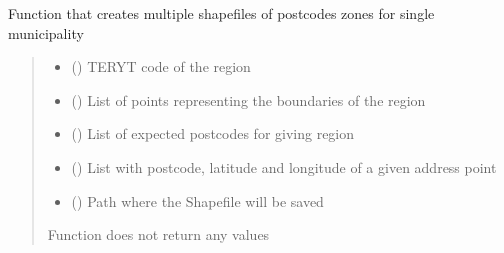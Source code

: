 \documentclass[letterpaper,10pt,english]{sphinxmanual}
\begin{document}
\begin{fulllineitems}
\label{\detokenize{pcm_utilities:pcm_utilities.mult_pc_zones_shps}}
\pysigstartsignatures
{}
\pysigstopsignatures
\sphinxAtStartPar
Function that creates multiple shapefiles of postcodes zones for single municipality
\begin{quote}\begin{description}
\begin{itemize}
\item {} 
\sphinxAtStartPar
{} () \textendash{} TERYT code of the region

\item {} 
\sphinxAtStartPar
{} (\sphinxcode{\sphinxupquote{List}}{[}\sphinxcode{\sphinxupquote{Any}}{]}) \textendash{} List of points representing the boundaries of the region

\item {} 
\sphinxAtStartPar
{} (\sphinxcode{\sphinxupquote{List}}{[}\sphinxcode{\sphinxupquote{str}}{]}) \textendash{} List of expected postcodes for giving region

\item {} 
\sphinxAtStartPar
{} (\sphinxcode{\sphinxupquote{List}}{[}\sphinxcode{\sphinxupquote{Any}}{]}) \textendash{} List with postcode, latitude and longitude of a given address point

\item {} 
\sphinxAtStartPar
{} () \textendash{} Path where the Shapefile will be saved

\end{itemize}

\sphinxAtStartPar
{}

\sphinxAtStartPar
Function does not return any values

\end{description}\end{quote}

\end{fulllineitems}
\end{document}
